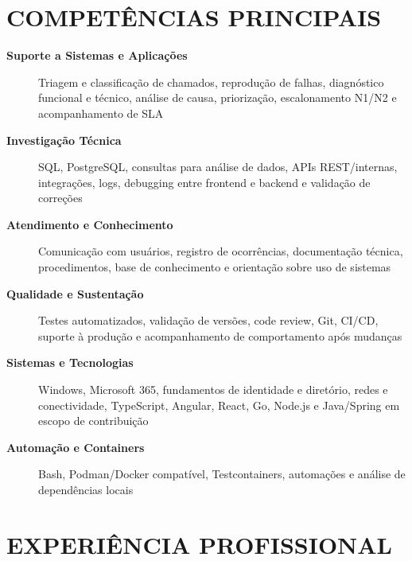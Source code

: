 \documentclass[10pt,a4paper]{article}
\begin{document}

\section*{COMPETÊNCIAS PRINCIPAIS}

\footnotesize

\begin{description}
    \item[\textbf{Suporte a Sistemas e Aplicações}]
    Triagem e classificação de chamados, reprodução de falhas, diagnóstico funcional e técnico, análise de causa, priorização, escalonamento N1/N2 e acompanhamento de SLA

    \item[\textbf{Investigação Técnica}]
    SQL, PostgreSQL, consultas para análise de dados, APIs REST/internas, integrações, logs, debugging entre frontend e backend e validação de correções

    \item[\textbf{Atendimento e Conhecimento}]
    Comunicação com usuários, registro de ocorrências, documentação técnica, procedimentos, base de conhecimento e orientação sobre uso de sistemas

    \item[\textbf{Qualidade e Sustentação}]
    Testes automatizados, validação de versões, code review, Git, CI/CD, suporte à produção e acompanhamento de comportamento após mudanças

    \item[\textbf{Sistemas e Tecnologias}]
    Windows, Microsoft 365, fundamentos de identidade e diretório, redes e conectividade, TypeScript, Angular, React, Go, Node.js e Java/Spring em escopo de contribuição

    \item[\textbf{Automação e Containers}]
    Bash, Podman/Docker compatível, Testcontainers, automações e análise de dependências locais
\end{description}


\section*{EXPERIÊNCIA PROFISSIONAL}
\end{document}
